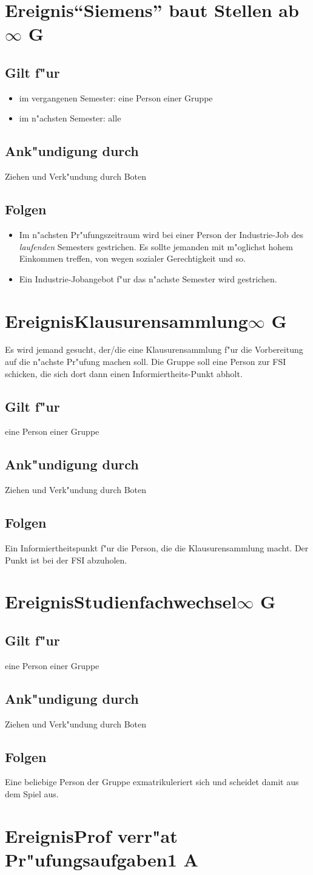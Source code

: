 \documentclass[a4paper,12pt]{article}
\def\Ereignis#1{\newpage\section[#1]{Ereignis\hfil\break#1}}
\def\Ereigniss#1#2{\Ereignis{#1\hfill#2}}
\def\Folgen{\subsection*{Folgen}}
\def\fuer{\subsection*{Gilt f"ur}}
\def\Ankuendigung{\subsection*{Ank"undigung durch}}
\def\bi{\begin{itemize}}
\def\ei{\end{itemize}}
\begin{document}
\Ereigniss{"`Siemens"' baut Stellen ab}{$\infty$ G}

\fuer

\bi
\item
im vergangenen Semester:
eine Person einer Gruppe
\item
im n"achsten Semester:
alle
\ei

\Ankuendigung

Ziehen und Verk"undung durch Boten

\Folgen

\bi
\item
Im n"achsten Pr"ufungszeitraum wird bei einer Person der Industrie-Job des 
{\em laufenden\/} Semesters gestrichen. Es sollte jemanden mit 
m"oglichst hohem Einkommen treffen, von wegen sozialer 
Gerechtigkeit und so.
\item
Ein Industrie-Jobangebot f"ur das n"achste Semester wird gestrichen.
\ei

\Ereigniss{Klausurensammlung}{$\infty$ G}

Es wird jemand gesucht, der/die eine Klausurensammlung f"ur die 
Vorbereitung auf die n"achste Pr"ufung machen soll.
Die Gruppe soll eine Person zur FSI schicken, die sich dort dann einen 
Informiertheits-Punkt abholt.

\fuer

eine Person einer Gruppe

\Ankuendigung

Ziehen und Verk"undung durch Boten

\Folgen

Ein Informiertheitspunkt f"ur die Person, die die Klausurensammlung 
macht. Der Punkt ist bei der FSI abzuholen.

\Ereigniss{Studienfachwechsel}{$\infty$ G}

\fuer

eine Person einer Gruppe

\Ankuendigung

Ziehen und Verk"undung durch Boten

\Folgen

Eine beliebige Person der Gruppe exmatrikuleriert sich und 
scheidet damit aus dem Spiel aus.

\Ereigniss{Prof verr"at Pr"ufungsaufgaben}{1 A}
\end{document}
